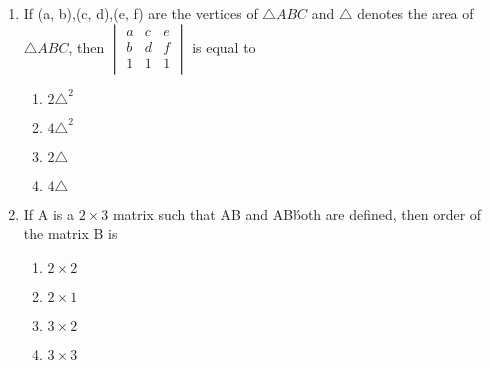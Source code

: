 \begin{enumerate}
\item If (a, b),(c, d),(e, f) are the vertices of $\triangle ABC$ and $\triangle$ denotes the area of $\triangle ABC$, then 
        ${\begin{vmatrix}
            a& c& e \\ b& d& f \\ 1& 1& 1  
        \end{vmatrix}} $ is equal to
    \begin{enumerate}
        \item $ 2\triangle^2 $
        \item $  4\triangle^2 $ 
        \item $  2\triangle $ 
        \item $ 4\triangle $ 
    \end{enumerate}
		\item If A is a ${2 \times 3}$ matrix such that AB and AB\' both are defined, then order of the matrix B is
    \begin{enumerate}
        \item $  2 \times 2  $
        \item $  2 \times 1 $ 
        \item $ 3 \times 2 $ 
        \item $  3 \times 3 $ 
    \end{enumerate}


\end{enumerate}
